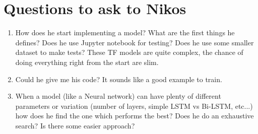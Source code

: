 \documentclass[11pt,a4paper]{article}
\begin{document}
\section{Questions to ask to Nikos}
\begin{enumerate}
\item How does he start implementing a model? What are the first things he defines? Does he use Jupyter notebook for testing? Does he use some smaller dataset to make tests? These TF models are quite complex, the chance of doing everything right from the start are slim.
\item Could he give me his code? It sounds like a good example to train.
\item When a model (like a Neural network) can have plenty of different parameters or variation (number of layers, simple LSTM vs Bi-LSTM, etc...) how does he find the one which performs the best? Does he do an exhaustive search? Is there some easier approach?
\end{enumerate}
\end{document}
